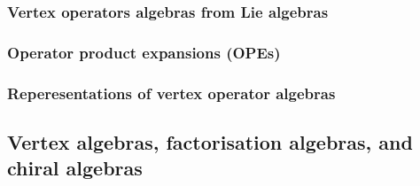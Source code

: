         
        \subsubsection{Vertex operators algebras from Lie algebras}
        
        \subsubsection{Operator product expansions (OPEs)}
        
        \subsubsection{Reperesentations of vertex operator algebras}
    
    \subsection{Vertex algebras, factorisation algebras, and chiral algebras}
